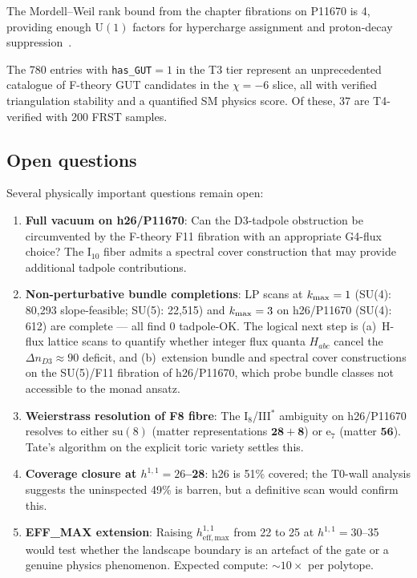 \documentclass[11pt,a4paper]{article}
\newcommand{\effmax}{h^{1,1}_{\mathrm{eff,max}}}
\begin{document}
The Mordell--Weil rank bound from the chapter fibrations on P11670 is 4,
providing enough $\mathrm{U}(1)$ factors for hypercharge assignment
and proton-decay suppression~\cite{Cvetic2010}.

The 780 entries with \texttt{has\_GUT}$=1$ in the T3 tier represent
an unprecedented catalogue of F-theory GUT candidates in the
$\chi=-6$ slice, all with verified triangulation stability and
a quantified SM physics score.
Of these, 37 are T4-verified with 200 FRST samples.

\subsection{Open questions}

Several physically important questions remain open:

\begin{enumerate}[noitemsep]
  \item \textbf{Full vacuum on h26/P11670}: Can the D3-tadpole
    obstruction be circumvented by the F-theory F11 fibration
    with an appropriate G4-flux choice?
    The $\mathrm{I}_{10}$ fiber admits a spectral cover construction
    that may provide additional tadpole contributions.
  \item \textbf{Non-perturbative bundle completions}: LP scans
    at $k_{\rm max}=1$ (SU(4): 80{,}293 slope-feasible;
    SU(5): 22{,}515) and $k_{\rm max}=3$ on h26/P11670
    (SU(4): 612) are complete --- all find 0 tadpole-OK.
    The logical next step is (a)~H-flux lattice scans to quantify
    whether integer flux quanta $H_{abc}$ cancel the $\Delta n_{D3}\approx 90$
    deficit, and (b)~extension bundle and spectral cover constructions
    on the SU(5)/F11 fibration of h26/P11670, which probe
    bundle classes not accessible to the monad ansatz.
  \item \textbf{Weierstrass resolution of F8 fibre}: The I$_8$/III$^*$
    ambiguity on h26/P11670 resolves to either $\mathrm{su}(8)$
    (matter representations $\mathbf{28}+\mathbf{8}$) or
    $\mathrm{e}_7$ (matter $\mathbf{56}$).  Tate's algorithm on the
    explicit toric variety settles this.
  \item \textbf{Coverage closure at $h^{1,1}=26$--28}: h26 is 51\%
    covered; the T0-wall analysis suggests the uninspected 49\%
    is barren, but a definitive scan would confirm this.
  \item \textbf{EFF\_MAX extension}: Raising $\effmax$ from 22 to 25
    at $h^{1,1}=30$--35 would test whether the landscape boundary
    is an artefact of the gate or a genuine physics phenomenon.
    Expected compute: $\sim 10\times$ per polytope.
\end{enumerate}
\end{document}
